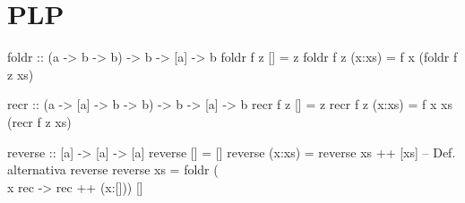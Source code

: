 \documentclass{article}
\begin{document}
\section{PLP}


\begin{multicols}{2}
\begin{haskcode}
foldr :: (a -> b -> b) -> b -> [a] -> b
foldr f z [] = z
foldr f z (x:xs) = f x (foldr f z xs)
\end{haskcode}

\begin{haskcode}
recr :: (a -> [a] -> b -> b) -> b -> [a] -> b
recr f z [] = z
recr f z (x:xs) = f x xs (recr f z xs)
\end{haskcode}

\begin{haskcode}
reverse :: [a] -> [a] -> [a]
reverse [] = []
reverse (x:xs) = reverse xs ++ [xs]
-- Def. alternativa reverse
reverse xs = foldr (\\x rec -> rec ++ (x:[])) [] 
\end{haskcode}


\end{multicols}
\end{document}
